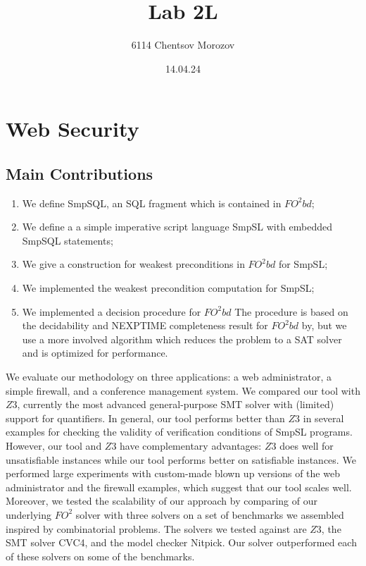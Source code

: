 \documentclass[12pt]{gji}
\begin{document}
\begin{titlepage}
\title{Lab 2L}
\author{6114 Chentsov Morozov}
\date{14.04.24}
\maketitle
\thispagestyle{empty}
\end{titlepage}


\tableofcontents
\newpage


\section{Web Security}

\subsection{Main Contributions}

\begin{enumerate}
    \item We define SmpSQL, an SQL fragment which is contained in $FO^2bd$;
    \item We define a a simple imperative script language SmpSL with embedded SmpSQL statements;
    \item We give a construction for weakest preconditions in $FO^2bd$ for SmpSL;
    \item We implemented the weakest precondition computation for SmpSL;
    \item We implemented a decision procedure for $FO^2bd$ The procedure is based on the decidability and NEXPTIME completeness result for $FO^2bd$ by, but we use a more involved algorithm which reduces the problem to a SAT solver and is optimized for performance.
\end{enumerate}

We evaluate our methodology on three applications: a web administrator, a simple firewall, and a conference management system. We compared our tool with $Z3$, currently the most advanced general-purpose SMT solver with (limited) support for quantifiers. In general, our tool performs better than $Z3$ in several examples for checking the validity of verification conditions of SmpSL programs. However, our tool and $Z3$ have complementary advantages: $Z3$ does well for unsatisfiable instances while our tool performs better on satisfiable instances. We performed large experiments with custom-made blown up versions of the web administrator and the firewall examples, which suggest that our tool scales well. Moreover, we tested the scalability of our approach by comparing of our underlying $FO^2$ solver with three solvers on a set of benchmarks we assembled inspired by combinatorial problems. The solvers we tested against are $Z3$, the SMT solver CVC4, and the model checker Nitpick. Our solver outperformed each of these solvers on some of the benchmarks.
\end{document}
